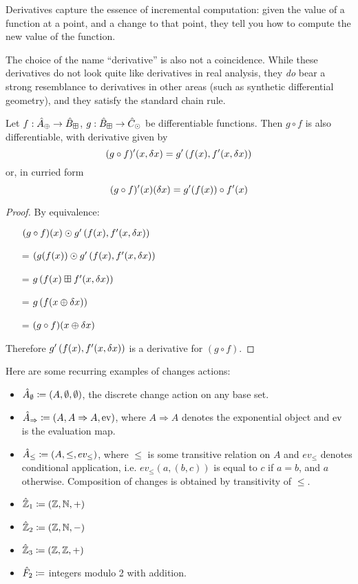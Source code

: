 Derivatives capture the essence of incremental computation: given the value of a
function at a point, and a change to that point, they tell you how to compute
the new value of the function.

The choice of the name ``derivative'' is also not a coincidence. While these
derivatives do not look quite like derivatives in real analysis, they \emph{do}
bear a strong resemblance to derivatives in other areas (such as synthetic differential geometry), and
they satisfy the standard chain rule.

\begin{thm}
  Let $f: \hat{A}_\oplus \rightarrow \hat{B}_\boxplus$, $g: \hat{B}_\boxplus \rightarrow \hat{C}_\odot$ be differentiable functions. Then $g \circ f$ is also
  differentiable, with derivative given by
   $$(g \circ f)'(x, \delta x) = g'\left(f(x), f'(x, \delta x)\right)$$
   or, in curried form
   $$(g \circ f)'(x)(\delta x) = g'(f(x)) \circ f'(x)$$
\end{thm}
\ifproofs
\begin{proof}
  By equivalence:
  \begin{itemize}
    \item[ ]$(g \circ f)(x) \odot g'\left(f(x), f'(x,\delta x)\right)$
    \item[=]$(g(f(x)) \odot g'\left(f(x), f'(x,\delta x)\right)$
    \item[=]$g\left(f(x) \boxplus f'(x, \delta x) \right)$
    \item[=]$g\left(f(x \oplus \delta x)\right)$
    \item[=]$(g \circ f)(x \oplus \delta x)$
  \end{itemize}
  Therefore $g'\left(f(x), f'(x, \delta x)\right)$ is a
  derivative for $(g \circ f)$.
\end{proof}
\fi

Here are some recurring examples of changes actions:
\begin{itemize}
  \item $\hat{A}_\emptyset \coloneqq (A,\emptyset,\emptyset)$, the discrete change action on any base set.
  \item $\hat{A}_\Rightarrow \coloneqq (A,A\Rightarrow A,\operatorname{ev})$, where $A
    \Rightarrow A$ denotes the exponential object and $\operatorname{ev}$ is the evaluation map.
  \item $\hat{A}_\leq \coloneqq (A,\leq,ev_\leq)$, where $\leq$ is some
    transitive relation on $A$ and $ev_\leq$ denotes
    conditional application, i.e. $ev_\leq(a, (b, c))$ is equal to $c$ if $a = b$, and $a$ otherwise. Composition of changes is obtained
    by transitivity of $\leq$.
  \item $\hat{\mathbb{Z}}_1 \coloneqq (\mathbb{Z},\mathbb{N},+)$
  \item $\hat{\mathbb{Z}}_2 \coloneqq (\mathbb{Z},\mathbb{N},-)$
  \item $\hat{\mathbb{Z}}_3 \coloneqq (\mathbb{Z},\mathbb{Z},+)$
  \item $\hat{F}_2 \coloneqq$ integers modulo 2 with addition.
\end{itemize}

